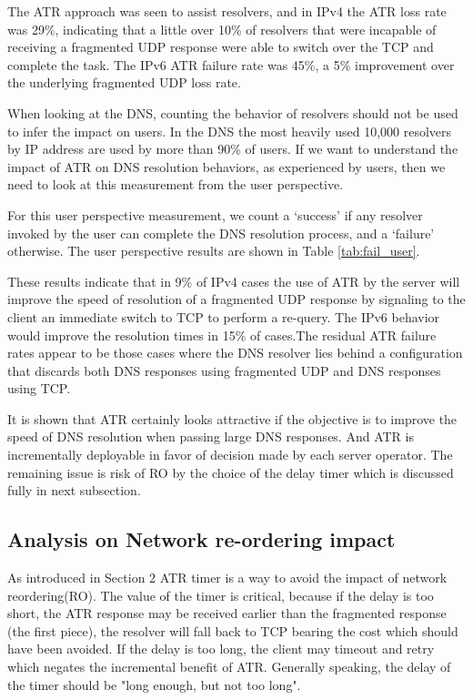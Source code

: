 The ATR approach was seen to assist resolvers, and in IPv4 the 
ATR loss rate was 29\%, indicating that a little over 10\% of 
resolvers that were incapable of receiving a fragmented UDP 
response were able to switch over the TCP and complete the task. 
The IPv6 ATR failure rate was 45\%, a 5\% improvement over the 
underlying fragmented UDP loss rate.

When looking at the DNS, counting the behavior of resolvers 
should not be used to infer the impact on users. In the DNS 
the most heavily used 10,000 resolvers by IP address are used 
by more than 90\% of users. If we want to understand the impact 
of ATR on DNS resolution behaviors, as experienced by users, 
then we need to look at this measurement from the user perspective.

For this user perspective measurement, we count a ‘success’ 
if any resolver invoked by the user can complete the DNS 
resolution process, and a ‘failure’ otherwise. The user 
perspective results are shown in Table \ref{tab:fail_user}.

These results indicate that in 9\% of IPv4 cases the use of ATR
by the server will improve the speed of resolution of a fragmented
UDP response by signaling to the client an immediate switch to
TCP to perform a re-query. The IPv6 behavior would improve the
resolution times in 15\% of cases.The residual ATR failure
rates appear to be those cases where the DNS resolver lies
behind a configuration that discards both DNS responses using
fragmented UDP and DNS responses using TCP.

It is shown that ATR certainly looks attractive if the objective is
to improve the speed of DNS resolution when passing large DNS responses.
And ATR is incrementally deployable in favor of decision made by each
server operator.  The remaining issue is risk of RO by the choice of
the delay timer which is discussed fully in next subsection.



\subsection{Analysis on Network re-ordering impact}


As introduced in Section 2 ATR timer is a way to avoid the impact of
network reordering(RO).  The value of the timer is critical, because
if the delay is too short, the ATR response may be received earlier
than the fragmented response (the first piece), the resolver will
fall back to TCP bearing the cost which should have been avoided.  If
the delay is too long, the client may timeout and retry which negates
the incremental benefit of ATR.  Generally speaking, the delay of the
timer should be "long enough, but not too long".

